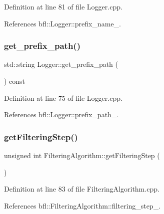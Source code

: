 Definition at line 81 of file Logger.\+cpp.



References bfl\+::\+Logger\+::prefix\+\_\+name\+\_\+.

\mbox{\label{classbfl_1_1Logger_a56cf1a4e712bf23d9978420a8a59a62b}} 
\subsubsection{\texorpdfstring{get\+\_\+prefix\+\_\+path()}{get\_prefix\_path()}}
{\footnotesize\ttfamily std\+::string Logger\+::get\+\_\+prefix\+\_\+path (\begin{DoxyParamCaption}{ }\end{DoxyParamCaption}) const\hspace{0.3cm}{\ttfamily [inherited]}}



Definition at line 75 of file Logger.\+cpp.



References bfl\+::\+Logger\+::prefix\+\_\+path\+\_\+.

\mbox{\label{classbfl_1_1FilteringAlgorithm_a8c43b1f3dac30934c0a03de348d4a29d}} 
\subsubsection{\texorpdfstring{get\+Filtering\+Step()}{getFilteringStep()}}
{\footnotesize\ttfamily unsigned int Filtering\+Algorithm\+::get\+Filtering\+Step (\begin{DoxyParamCaption}{ }\end{DoxyParamCaption})\hspace{0.3cm}{\ttfamily [inherited]}}



Definition at line 83 of file Filtering\+Algorithm.\+cpp.



References bfl\+::\+Filtering\+Algorithm\+::filtering\+\_\+step\+\_\+.

